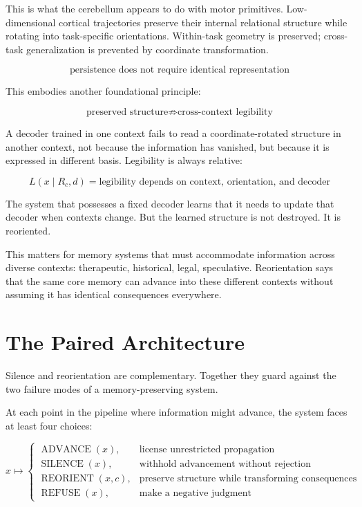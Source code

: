 \documentclass[12pt]{article}
\begin{document}
This is what the cerebellum appears to do with motor primitives. Low-dimensional cortical trajectories preserve their internal relational structure while rotating into task-specific orientations. Within-task geometry is preserved; cross-task generalization is prevented by coordinate transformation.

\begin{equation}
\boxed{\text{persistence does not require identical representation}}
\end{equation}

This embodies another foundational principle:

\begin{equation}
\boxed{\text{preserved structure} \not\Rightarrow \text{cross-context legibility}}
\end{equation}

A decoder trained in one context fails to read a coordinate-rotated structure in another context, not because the information has vanished, but because it is expressed in different basis. Legibility is always relative:

\begin{equation}
L(x \mid R_c, d) = \text{legibility depends on context, orientation, and decoder}
\end{equation}

The system that possesses a fixed decoder learns that it needs to update that decoder when contexts change. But the learned structure is not destroyed. It is reoriented.

This matters for memory systems that must accommodate information across diverse contexts: therapeutic, historical, legal, speculative. Reorientation says that the same core memory can advance into these different contexts without assuming it has identical consequences everywhere.

\section{The Paired Architecture}

Silence and reorientation are complementary. Together they guard against the two failure modes of a memory-preserving system.

At each point in the pipeline where information might advance, the system faces at least four choices:

\begin{equation}
x \longmapsto \begin{cases}
\operatorname{ADVANCE}(x), & \text{license unrestricted propagation}\\
\operatorname{SILENCE}(x), & \text{withhold advancement without rejection}\\
\operatorname{REORIENT}(x, c), & \text{preserve structure while transforming consequences}\\
\operatorname{REFUSE}(x), & \text{make a negative judgment}
\end{cases}
\end{equation}
\end{document}
